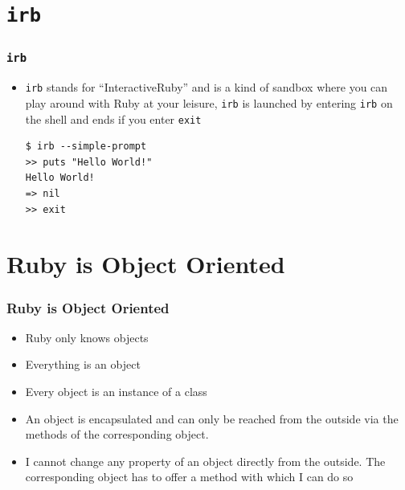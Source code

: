 \documentclass{beamer}
\begin{document}
\section{\texttt{irb}}
\begin{frame}[fragile]
\frametitle{\texttt{irb}}
\begin{itemize}
 \item \texttt{irb} stands for ``InteractiveRuby'' and is a kind of sandbox where you can play around with Ruby at your leisure, \texttt{irb} is launched by entering \texttt{irb} on the shell and ends if you enter \texttt{exit}
\lstset{language=shell}
\begin{lstlisting}[numbers=none,escapechar=&]
$ irb --simple-prompt
>> puts "Hello World!"
Hello World!
=> nil
>> exit
\end{lstlisting}
\end{itemize}
\end{frame}
\section{Ruby is Object Oriented}
\begin{frame}[fragile]
\frametitle{Ruby is Object Oriented}
\begin{itemize}
 \item Ruby only knows objects
 \item Everything is an object
 \item Every object is an instance of a class
 \item An object is encapsulated and can only be reached from the outside via the methods of the corresponding object.
 \item I cannot change any property of an object directly from the outside. The corresponding object has to offer a method with which I can do so
\end{itemize}

\end{frame}
\end{document}
